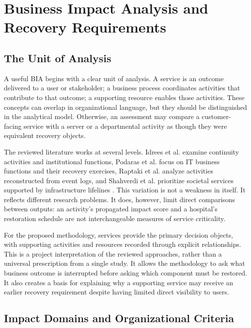 \section{Business Impact Analysis and Recovery Requirements}

\subsection{The Unit of Analysis}

A useful BIA begins with a clear unit of analysis. A service is an outcome delivered to a user or stakeholder; a business process coordinates activities that contribute to that outcome; a supporting resource enables those activities. These concepts can overlap in organizational language, but they should be distinguished in the analytical model. Otherwise, an assessment may compare a customer-facing service with a server or a departmental activity as though they were equivalent recovery objects.

The reviewed literature works at several levels. Idrees et al. examine continuity activities and institutional functions, Podaras et al. focus on IT business functions and their recovery exercises, Raptaki et al. analyze activities reconstructed from event logs, and Shahverdi et al. prioritize societal services supported by infrastructure lifelines \cite{idrees2019bcis,podaras2016tools,raptaki2025propagation,shahverdi2025recovery}. This variation is not a weakness in itself. It reflects different research problems. It does, however, limit direct comparisons between outputs: an activity's propagated impact score and a hospital's restoration schedule are not interchangeable measures of service criticality.

For the proposed methodology, services provide the primary decision objects, with supporting activities and resources recorded through explicit relationships. This is a project interpretation of the reviewed approaches, rather than a universal prescription from a single study. It allows the methodology to ask what business outcome is interrupted before asking which component must be restored. It also creates a basis for explaining why a supporting service may receive an earlier recovery requirement despite having limited direct visibility to users.

\subsection{Impact Domains and Organizational Criteria}

